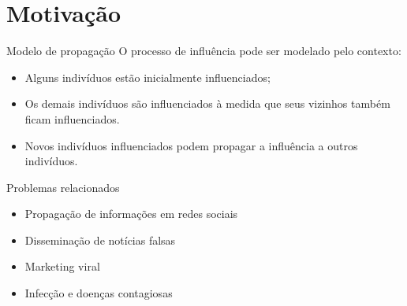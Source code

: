 \section{Motivação}
\begin{frame}{Modelo de propagação}
      O processo de influência pode ser modelado pelo contexto:

      \begin{itemize}
            \tightlist
            \item
                  Alguns indivíduos estão inicialmente influenciados;
            \item
                  Os demais indivíduos são influenciados à medida que seus vizinhos
                  também ficam influenciados.
            \item
                  Novos indivíduos influenciados podem propagar a influência a outros
                  indivíduos.
      \end{itemize}
\end{frame}

\begin{frame}{Problemas relacionados}
      \begin{itemize}
            \tightlist
            \item
                  Propagação de informações em redes sociais
            \item
                  Disseminação de notícias falsas
            \item
                  Marketing viral
            \item
                  Infecção e doenças contagiosas

      \end{itemize}
\end{frame}

